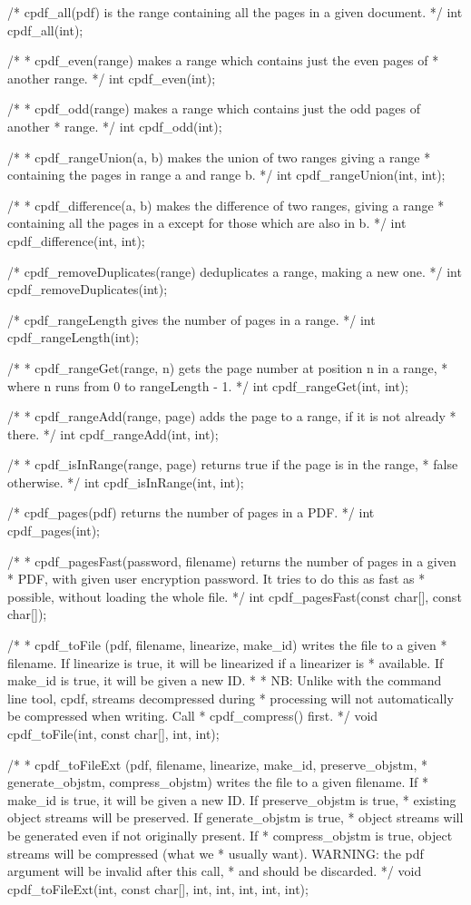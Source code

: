 /* cpdf_all(pdf) is the range containing all the pages in a given document. */
int cpdf_all(int);

/*
 * cpdf_even(range) makes a range which contains just the even pages of
 * another range.
 */
int cpdf_even(int);

/*
 * cpdf_odd(range) makes a range which contains just the odd pages of another
 * range.
 */
int cpdf_odd(int);

/*
 * cpdf_rangeUnion(a, b) makes the union of two ranges giving a range
 * containing the pages in range a and range b.
 */
int cpdf_rangeUnion(int, int);

/*
 * cpdf_difference(a, b) makes the difference of two ranges, giving a range
 * containing all the pages in a except for those which are also in b.
 */
int cpdf_difference(int, int);

/* cpdf_removeDuplicates(range) deduplicates a range, making a new one. */
int cpdf_removeDuplicates(int);

/* cpdf_rangeLength gives the number of pages in a range. */
int cpdf_rangeLength(int);

/*
 * cpdf_rangeGet(range, n) gets the page number at position n in a range,
 * where n runs from 0 to rangeLength - 1.
 */
int cpdf_rangeGet(int, int);

/*
 * cpdf_rangeAdd(range, page) adds the page to a range, if it is not already
 * there.
 */
int cpdf_rangeAdd(int, int);

/*
 * cpdf_isInRange(range, page) returns true if the page is in the range,
 * false otherwise.
 */
int cpdf_isInRange(int, int);

/* cpdf_pages(pdf) returns the number of pages in a PDF. */
int cpdf_pages(int);

/*
 * cpdf_pagesFast(password, filename) returns the number of pages in a given
 * PDF, with given user encryption password. It tries to do this as fast as
 * possible, without loading the whole file.
 */
int cpdf_pagesFast(const char[], const char[]);

/*
 * cpdf_toFile (pdf, filename, linearize, make_id) writes the file to a given
 * filename. If linearize is true, it will be linearized if a linearizer is
 * available. If make_id is true, it will be given a new ID.
 *
 * NB: Unlike with the command line tool, cpdf, streams decompressed during
 * processing will not automatically be compressed when writing. Call
 * cpdf_compress() first.
 */
void cpdf_toFile(int, const char[], int, int);

/*
 * cpdf_toFileExt (pdf, filename, linearize, make_id, preserve_objstm,
 * generate_objstm, compress_objstm) writes the file to a given filename. If
 * make_id is true, it will be given a new ID.  If preserve_objstm is true,
 * existing object streams will be preserved. If generate_objstm is true,
 * object streams will be generated even if not originally present. If
 * compress_objstm is true, object streams will be compressed (what we
 * usually want). WARNING: the pdf argument will be invalid after this call,
 * and should be discarded.
 */
void cpdf_toFileExt(int, const char[], int, int, int, int, int);

